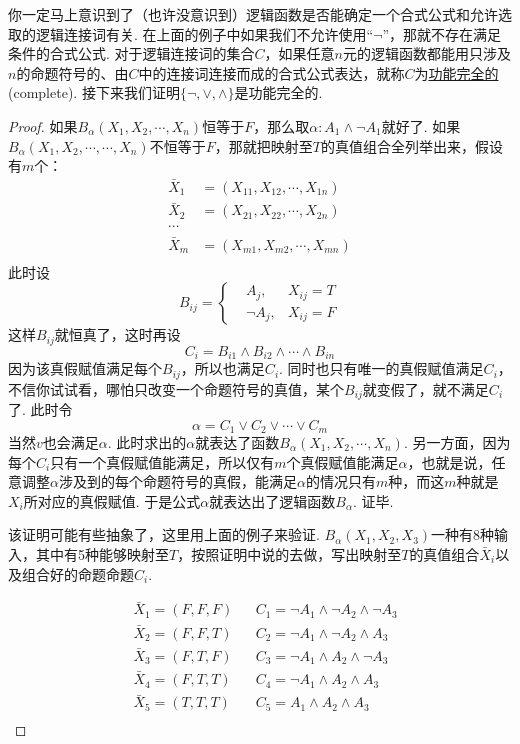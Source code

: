 你一定马上意识到了（也许没意识到）逻辑函数是否能确定一个合式公式和允许选取的逻辑连接词有关. 在上面的例子中如果我们不允许使用“\(\neg\)”，那就不存在满足条件的合式公式. 对于逻辑连接词的集合\(C\)，如果任意\(n\)元的逻辑函数都能用只涉及\(n\)的命题符号的、由\(C\)中的连接词连接而成的合式公式表达，就称\(C\)为\underline{功能完全的}(complete). 接下来我们证明\(\{\neg, \vee, \wedge\}\)是功能完全的.

\begin{proof}
    如果\(B_\alpha(X_1, X_2, \cdots, X_n)\)恒等于\(F\)，那么取\(\alpha: A_1 \wedge \neg A_1\)就好了. \newline
    如果\(B_\alpha(X_1, X_2, \cdots, \cdots, X_n)\)不恒等于\(F\)，那就把映射至\(T\)的真值组合全列举出来，假设有\(m\)个：
    \begin{align*}
        \bar{X}_1 &= (X_{11}, X_{12}, \cdots, X_{1n}) \\
        \bar{X}_2 &= (X_{21}, X_{22}, \cdots, X_{2n}) \\
        \cdots &\\
        \bar{X}_m &= (X_{m1}, X_{m2}, \cdots, X_{mn}) \\
    \end{align*}
    此时设\[B_{ij} = \left\{ \begin{aligned} &A_{j}, &X_{ij} = T \\ &\neg A_j, &X_{ij} = F \end{aligned} \right.\]
    这样\(B_{ij}\)就恒真了，这时再设
    \[C_i = B_{i1} \wedge B_{i2} \wedge \cdots \wedge B_{in}\]
    因为该真假赋值满足每个\(B_{ij}\)，所以也满足\(C_i\). 同时也只有唯一的真假赋值满足\(C_i\)，不信你试试看，哪怕只改变一个命题符号的真值，某个\(B_{ij}\)就变假了，就不满足\(C_i\)了. 此时令
    \[\alpha = C_1 \vee C_2 \vee \cdots \vee C_m\]
    当然\(v\)也会满足\(\alpha\). 此时求出的\(\alpha\)就表达了函数\(B_\alpha(X_1, X_2, \cdots, X_n)\). 另一方面，因为每个\(C_i\)只有一个真假赋值能满足，所以仅有\(m\)个真假赋值能满足\(\alpha\)，也就是说，任意调整\(\alpha\)涉及到的每个命题符号的真假，能满足\(\alpha\)的情况只有\(m\)种，而这\(m\)种就是\(X_i\)所对应的真假赋值. 于是公式\(\alpha\)就表达出了逻辑函数\(B_\alpha\). 证毕.

    该证明可能有些抽象了，这里用上面的例子来验证. \(B_\alpha(X_1, X_2, X_3)\)一种有8种输入，其中有5种能够映射至\(T\)，按照证明中说的去做，写出映射至\(T\)的真值组合\(\bar{X}_i\)以及组合好的命题命题\(C_i\).
    
    \begin{align*}
        &\bar{X}_1 = (F,F,F) && C_1 = \neg A_1 \wedge \neg A_2 \wedge \neg A_3 \\
        &\bar{X}_2 = (F,F,T) && C_2 = \neg A_1 \wedge \neg A_2 \wedge A_3 \\
        &\bar{X}_3 = (F,T,F) && C_3 = \neg A_1 \wedge A_2 \wedge \neg A_3 \\
        &\bar{X}_4 = (F,T,T) && C_4 = \neg A_1 \wedge A_2 \wedge A_3 \\
        &\bar{X}_5 = (T,T,T) && C_5 = A_1 \wedge A_2 \wedge A_3 \\
    \end{align*}


\end{proof}
